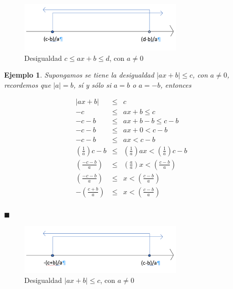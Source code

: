 \documentclass[]{book}
\newtheorem{Ejem}{Ejemplo}[chapter]
\begin{document}
\begin{figure}
\centering
\includegraphics[width=3.12500in]{Desigualdad3.png}
\caption{Desigualdad \(c\leq ax+b\leq d\), con \(a\neq0\)}
\end{figure}

\begin{Ejem}
Supongamos se tiene la desigualdad $|ax+b|\leq c$, con $a\neq0$, recordemos que $|a|=b$, sí y sólo si $a=b$ o $a=-b$, entonces

\begin{eqnarray*}
|ax+b|&\leq& c\\
-c&\leq& ax+b \leq c\\
-c-b&\leq& ax+b-b \leq c-b\\
-c-b&\leq& ax+0<c-b\\
-c-b&\leq& ax<c-b\\
\left(\frac{1}{a}\right)c-b&\leq& \left(\frac{1}{a}\right)ax<\left(\frac{1}{a}\right)c-b\\
\left(\frac{-c-b}{a}\right)&\leq& \left(\frac{a}{a}\right)x<\left(\frac{c-b}{a}\right)\\
\left(\frac{-c-b}{a}\right)&\leq& x<\left(\frac{c-b}{a}\right)\\
-\left(\frac{c+b}{a}\right)&\leq& x<\left(\frac{c-b}{a}\right)\\
\end{eqnarray*}
\begin{flushright}
$\blacksquare$
\end{flushright}

\end{Ejem}

\begin{figure}
\centering
\includegraphics[width=3.12500in]{Desigualdad4.png}
\caption{Desigualdad \(|ax+b|\leq c\), con \(a\neq0\)}
\end{figure}
\end{document}
